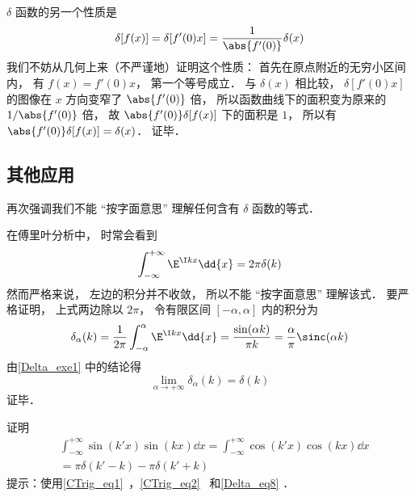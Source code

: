 $\delta$ 函数的另一个性质是
\begin{equation}
\delta[f(x)] = \delta[f'(0)x] = \frac{1}{\abs{f'(0)}} \delta(x)
\end{equation}
我们不妨从几何上来（不严谨地）证明这个性质： 首先在原点附近的无穷小区间内， 有 $f(x) = f'(0)x$， 第一个等号成立． 与 $\delta(x)$ 相比较， $\delta[f'(0)x]$ 的图像在 $x$ 方向变窄了 $\abs{f'(0)}$ 倍， 所以函数曲线下的面积变为原来的 $1/\abs{f'(0)}$ 倍， 故 $\abs{f'(0)}\delta[f(x)]$ 下的面积是 $1$， 所以有 $\abs{f'(0)}\delta[f(x)] = \delta(x)$． 证毕．

\subsection{其他应用}
再次强调我们不能 “按字面意思” 理解任何含有 $\delta$ 函数的等式．
\begin{example}{}\label{Delta_ex1}
在傅里叶分析中， 时常会看到
\begin{equation}\label{Delta_eq8}
\int_{-\infty}^{+\infty} \E^{\I kx}\dd{x} = 2\pi \delta(k)
\end{equation}
然而严格来说， 左边的积分并不收敛， 所以不能 “按字面意思” 理解该式． 要严格证明， 上式两边除以 $2\pi$， 令有限区间 $[-\alpha,\alpha]$ 内的积分为
\begin{equation}
\delta_\alpha(k) = \frac{1}{2\pi}\int_{-\alpha}^{\alpha} \E^{\I kx}\dd{x} = \frac{\sin(\alpha k)}{\pi k} = \frac{\alpha}{\pi} \sinc(\alpha k)
\end{equation}
由\autoref{Delta_exe1} 中的结论得
\begin{equation}
\lim_{\alpha\to+\infty} \delta_\alpha(k) = \delta(k)
\end{equation}
证毕．
\end{example}

\begin{exercise}{}
证明
\begin{equation}\label{Delta_eq9}
\begin{aligned}%
&\int_{-\infty}^{+\infty} \sin(k'x) \sin(kx) \dd{x} = \int_{-\infty}^{+\infty} \cos(k'x) \cos(kx) \dd{x}\\
&= \pi\delta(k' - k) - \pi\delta(k' + k)
\end{aligned}
\end{equation}
提示：使用\autoref{CTrig_eq1}~，\autoref{CTrig_eq2}~ 和\autoref{Delta_eq8} ．
\end{exercise}

